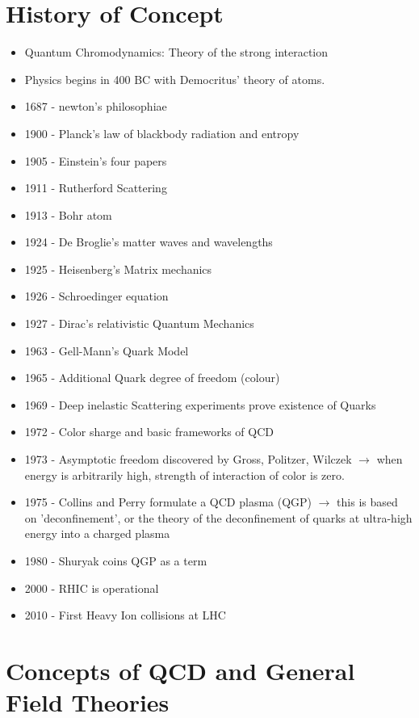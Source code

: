 \documentclass{article}
\begin{document}
\section{History of Concept}
\begin{itemize}
\setlength\itemsep{0em}
        \item Quantum Chromodynamics: Theory of the strong interaction
        \item Physics begins in 400 BC with Democritus' theory of atoms.
        \item 1687 - newton's philosophiae
        \item 1900 - Planck's law of blackbody radiation and entropy
        \item 1905 - Einstein's four papers
        \item 1911 - Rutherford Scattering
        \item 1913 - Bohr atom
        \item 1924 - De Broglie's matter waves and wavelengths
        \item 1925 - Heisenberg's Matrix mechanics
        \item 1926 - Schroedinger equation
        \item 1927 - Dirac's relativistic Quantum Mechanics
        \item 1963 - Gell-Mann's Quark Model
        \item 1965 - Additional Quark degree of freedom (colour)
        \item 1969 - Deep inelastic Scattering experiments prove existence of Quarks
        \item 1972 - Color sharge and basic frameworks of QCD
        \item 1973 - Asymptotic freedom discovered by Gross, Politzer, Wilczek $\rightarrow$ when energy is arbitrarily high,
             strength of interaction of color is zero.
        \item 1975 - Collins and Perry formulate a QCD plasma (QGP) $\rightarrow$ this is based on 'deconfinement', or the theory of
             the deconfinement of quarks at ultra-high energy into a charged plasma
        \item 1980 - Shuryak coins QGP as a term
        \item 2000 - RHIC is operational
        \item 2010 - First Heavy Ion collisions at LHC
\end{itemize}

\section{Concepts of QCD and General Field Theories}
\end{document}
